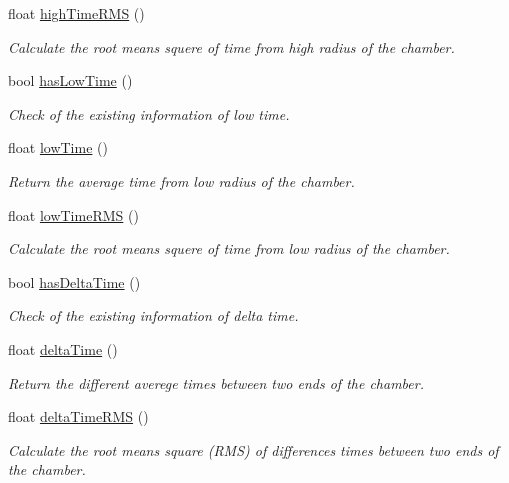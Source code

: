 \begin{DoxyCompactItemize}
float \hyperlink{classiRPCCluster_a9f3eee70a69b08c0b78b5261cc6e1428}{high\-Time\-R\-M\-S} ()
\begin{DoxyCompactList}\small\item\em Calculate the root means squere of time from high radius of the chamber. \end{DoxyCompactList}\item 
bool \hyperlink{classiRPCCluster_a85a3586b066bf59b09cf2efe04ff75e0}{has\-Low\-Time} ()
\begin{DoxyCompactList}\small\item\em Check of the existing information of low time. \end{DoxyCompactList}\item 
float \hyperlink{classiRPCCluster_a6bed3bb49e702b428970e8d87c2e67ca}{low\-Time} ()
\begin{DoxyCompactList}\small\item\em Return the average time from low radius of the chamber. \end{DoxyCompactList}\item 
float \hyperlink{classiRPCCluster_afa7d1bfcb0d6fd03775a6c7d2668e458}{low\-Time\-R\-M\-S} ()
\begin{DoxyCompactList}\small\item\em Calculate the root means squere of time from low radius of the chamber. \end{DoxyCompactList}\item 
bool \hyperlink{classiRPCCluster_aa4db7757b34dde34e9e1682770d1bb9b}{has\-Delta\-Time} ()
\begin{DoxyCompactList}\small\item\em Check of the existing information of delta time. \end{DoxyCompactList}\item 
float \hyperlink{classiRPCCluster_a138f7020eb72095167736f274c12fe22}{delta\-Time} ()
\begin{DoxyCompactList}\small\item\em Return the different averege times between two ends of the chamber. \end{DoxyCompactList}\item 
float \hyperlink{classiRPCCluster_a8df0ed88437ad09aab37dc2175bbc734}{delta\-Time\-R\-M\-S} ()
\begin{DoxyCompactList}\small\item\em Calculate the root means square (R\-M\-S) of differences times between two ends of the chamber. \end{DoxyCompactList}\item 

\end{DoxyCompactItemize}
